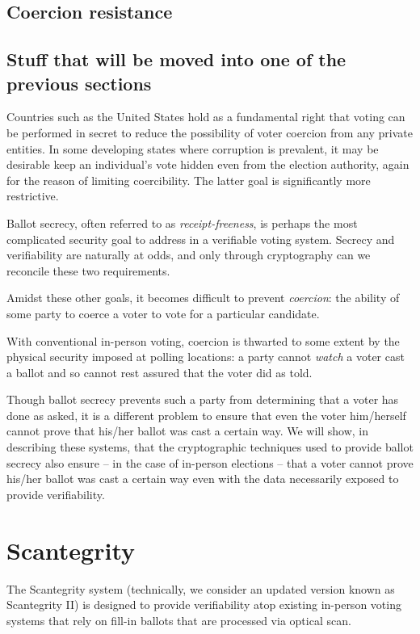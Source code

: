 \documentclass[10pt]{article}
\newcommand{\term}[1]{\textit{#1}}
\begin{document}
\begin{multicols}{2}
\subsection{Coercion resistance}

\subsection{Stuff that will be moved into one of the previous sections}

Countries such as the United States hold as a fundamental right that voting can be performed
in secret to reduce the possibility of voter coercion from any private entities.
In some developing states where corruption is prevalent, it may be desirable keep an
individual's vote hidden even from the election authority, again for the reason of
limiting coercibility. The latter goal is significantly more restrictive.

Ballot secrecy, often referred to as \term{receipt-freeness}, is perhaps the most complicated
security goal to address in a verifiable voting system.
Secrecy and verifiability are naturally at odds, and only through cryptography can we
reconcile these two requirements.

Amidst these other goals, it becomes difficult to prevent \term{coercion}: the ability of some party
to coerce a voter to vote for a particular candidate.

With conventional in-person voting, coercion is thwarted to some extent by the physical security
imposed at polling locations: a party cannot \emph{watch} a voter cast a ballot and so cannot rest
assured that the voter did as told.

Though ballot secrecy prevents such a party from determining that a voter has done as asked, it is a
different problem to ensure that even the voter him/herself cannot prove that his/her ballot was
cast a certain way. We will show, in describing these systems, that the cryptographic techniques
used to provide ballot secrecy also ensure -- in the case of in-person elections -- that a voter
cannot prove his/her ballot was cast a certain way even with the data necessarily exposed to provide
verifiability.

\section{Scantegrity}

The Scantegrity system \cite{scantegrity_ii} (technically, we consider an updated version known as
Scantegrity II) is designed to provide verifiability atop existing in-person voting systems that
rely on fill-in ballots that are processed via optical scan.


\end{multicols}
\end{document}
